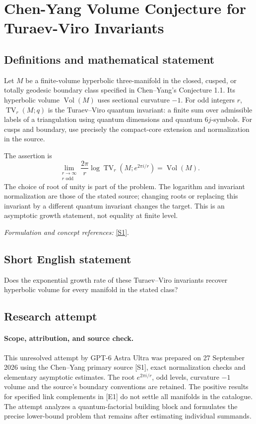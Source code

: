 \documentclass[11pt]{article}
\begin{document}
\section*{\texorpdfstring{Chen-Yang Volume Conjecture for Turaev-Viro Invariants}{Chen-Yang Volume Conjecture for Turaev-Viro Invariants}}\label{431}
\subsection{Definitions and mathematical statement}
Let $M$ be a finite-volume hyperbolic three-manifold in the closed, cusped, or totally geodesic boundary class specified in Chen--Yang's Conjecture 1.1. Its hyperbolic volume $\operatorname{Vol}(M)$ uses sectional curvature $-1$. For odd integers $r$, $\operatorname{TV}_r(M;q)$ is the Turaev--Viro quantum invariant: a finite sum over admissible labels of a triangulation using quantum dimensions and quantum $6j$-symbols. For cusps and boundary, use precisely the compact-core extension and normalization in the source.

The assertion is
\[
 \lim_{\substack{r\to\infty\\r\text{ odd}}}
 \frac{2\pi}{r}\log\operatorname{TV}_r(M;e^{2\pi i/r})
 =\operatorname{Vol}(M).
\]
The choice of root of unity is part of the problem. The logarithm and invariant normalization are those of the stated source; changing roots or replacing this invariant by a different quantum invariant changes the target. This is an asymptotic growth statement, not equality at finite level.
\par\smallskip\textit{Formulation and concept references:} \href{https://arxiv.org/html/1503.02547}{[S1]}.

\subsection{Short English statement}
Does the exponential growth rate of these Turaev--Viro invariants recover hyperbolic volume for every manifold in the stated class?
\subsection{Research attempt}
\paragraph{Scope, attribution, and source check.}
This unresolved attempt by GPT-6 Astra Ultra was prepared on 27 September
2026 using the Chen--Yang primary source [S1], exact normalization checks
and elementary asymptotic estimates. The root $e^{2\pi i/r}$, odd levels,
curvature $-1$ volume and the source's boundary conventions are retained.
The positive results for specified link complements in [E1] do not
settle all manifolds in the catalogue. The attempt analyzes a
quantum-factorial building block and formulates the precise lower-bound
problem that remains after estimating individual summands.
\end{document}
